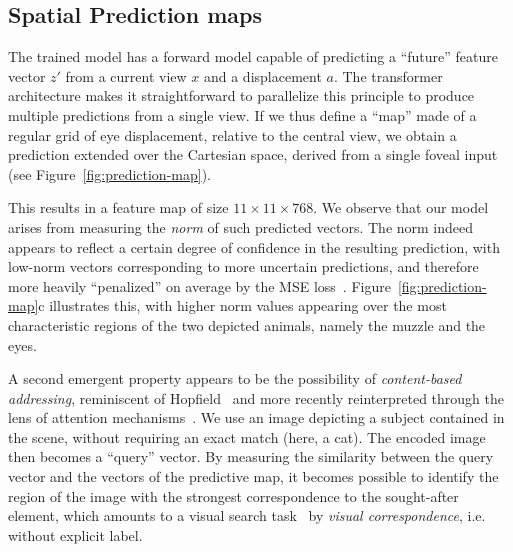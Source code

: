\documentclass{article}
\begin{document}
\subsection{Spatial Prediction maps}\label{sec:prediction-map}

The trained model has a forward model capable of predicting a ``future'' feature vector $z'$ from a current view $x$ and a displacement $a$. The transformer architecture makes it straightforward to parallelize this principle to produce multiple predictions from a single view. If we thus define a ``map'' made of a regular grid of eye displacement, relative to the central view, we obtain a prediction extended over the Cartesian space, derived from a single foveal input (see Figure~\ref{fig:prediction-map}).

This results in a feature map of size $11\times11\times768$. We observe that our model arises from measuring the \emph{norm} of such predicted vectors. The norm indeed appears to reflect a certain degree of confidence in the resulting prediction, with low-norm vectors corresponding to more uncertain predictions, and therefore more heavily ``penalized'' on average by the MSE loss~\cite{shi2019probabilistic,draganov2025embeddingnorms}. Figure~\ref{fig:prediction-map}c illustrates this, with higher norm values appearing over the most characteristic regions of the two depicted animals, namely the muzzle and the eyes.

A second emergent property appears to be the possibility of \emph{content-based addressing}, reminiscent of Hopfield~\cite{hopfield1982neural} and more recently reinterpreted through the lens of attention mechanisms~\cite{ramsauer2021hopfield}. We use an image depicting a subject contained in the scene, without requiring an exact match (here, a cat). The encoded image then becomes a ``query'' vector. By measuring the similarity between the query vector and the vectors of the predictive map, it becomes possible to identify the region of the image with the strongest correspondence to the sought-after element, which amounts to a visual search task~\cite{wolfe2021guided} by \emph{visual correspondence}, i.e. without explicit label.

\end{document}
